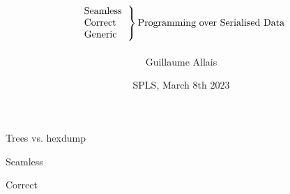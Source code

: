\documentclass{beamer}
\title{
  \[
  \left.
    \begin{tabular}{l}
      Seamless \\
      Correct \\
      Generic
    \end{tabular}
  \right\}
  \text{Programming over Serialised Data}
  \]}
\author{Guillaume Allais}
\institute{University of St Andrews}
\date{SPLS, March 8th 2023}
\begin{document}
\begin{frame}
  \maketitle
\end{frame}

\begin{frame}
  Trees vs. hexdump
\end{frame}

\begin{frame}{Seamless}
  \noindent
  \begin{minipage}{.7\textwidth}
  \end{minipage}\hfill

  \vfill

  \hfill\begin{minipage}{.7\textwidth}
  \end{minipage}
\end{frame}


\begin{frame}{Correct}
\end{frame}
\end{document}
